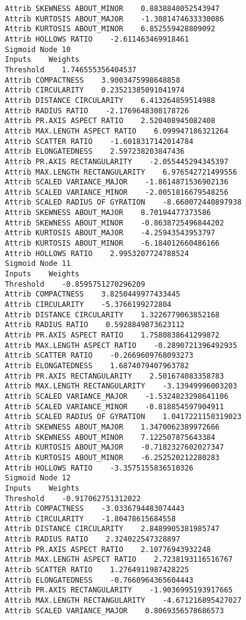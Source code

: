 \documentclass[
	article,			%
	11pt,				%
	oneside,			%
	a4paper,			%
	english,			%
	brazil,				%
	sumario=tradicional
	]{abntex2}
\begin{document}
\begin{lstlisting}
Attrib SKEWNESS ABOUT_MINOR    0.8838848052543947
Attrib KURTOSIS ABOUT_MAJOR    -1.3081474633330086
Attrib KURTOSIS ABOUT_MINOR    6.852559428809092
Attrib HOLLOWS RATIO    -2.611463469918461
Sigmoid Node 10
Inputs    Weights
Threshold    1.746555356404537
Attrib COMPACTNESS    3.9003475998648858
Attrib CIRCULARITY    0.23521385091041974
Attrib DISTANCE CIRCULARITY    6.413264859514988
Attrib RADIUS RATIO    -2.1769648308178726
Attrib PR.AXIS ASPECT RATIO    2.520408945082408
Attrib MAX.LENGTH ASPECT RATIO    6.099947186321264
Attrib SCATTER RATIO    -1.6018317142014784
Attrib ELONGATEDNESS    2.597238203847436
Attrib PR.AXIS RECTANGULARITY    -2.055445294345397
Attrib MAX.LENGTH RECTANGULARITY    6.976542721499556
Attrib SCALED VARIANCE_MAJOR    -1.8614871536902136
Attrib SCALED VARIANCE_MINOR    -2.0051816679548256
Attrib SCALED RADIUS OF GYRATION    -8.660072440897938
Attrib SKEWNESS ABOUT_MAJOR    8.70194477373586
Attrib SKEWNESS ABOUT_MINOR    -0.8638725496844202
Attrib KURTOSIS ABOUT_MAJOR    -4.25943543953797
Attrib KURTOSIS ABOUT_MINOR    -6.184012660486166
Attrib HOLLOWS RATIO    2.9953207724788524
Sigmoid Node 11
Inputs    Weights
Threshold    -0.8595751270296209
Attrib COMPACTNESS    3.8250449977433445
Attrib CIRCULARITY    -5.3766199272804
Attrib DISTANCE CIRCULARITY    1.3226779063852168
Attrib RADIUS RATIO    0.5928849873623112
Attrib PR.AXIS ASPECT RATIO    1.7580838641299872
Attrib MAX.LENGTH ASPECT RATIO    -0.2890721396492935
Attrib SCATTER RATIO    -0.2669609768093273
Attrib ELONGATEDNESS    1.6874079407963782
Attrib PR.AXIS RECTANGULARITY    2.501674083358783
Attrib MAX.LENGTH RECTANGULARITY    -3.13949996003203
Attrib SCALED VARIANCE_MAJOR    -1.5324823298641106
Attrib SCALED VARIANCE_MINOR    -0.818854597904911
Attrib SCALED RADIUS OF GYRATION    1.0417221150319023
Attrib SKEWNESS ABOUT_MAJOR    1.3470062389972666
Attrib SKEWNESS ABOUT_MINOR    7.122507875643384
Attrib KURTOSIS ABOUT_MAJOR    -0.7182327602027347
Attrib KURTOSIS ABOUT_MINOR    -6.252520212280283
Attrib HOLLOWS RATIO    -3.3575155836510326
Sigmoid Node 12
Inputs    Weights
Threshold    -0.917062751312022
Attrib COMPACTNESS    -3.0336794483074443
Attrib CIRCULARITY    -1.80478615684558
Attrib DISTANCE CIRCULARITY    2.8489905381985747
Attrib RADIUS RATIO    2.324022547328897
Attrib PR.AXIS ASPECT RATIO    2.10776943932248
Attrib MAX.LENGTH ASPECT RATIO    2.7238193116516767
Attrib SCATTER RATIO    1.2764911987428225
Attrib ELONGATEDNESS    -0.7660964365604443
Attrib PR.AXIS RECTANGULARITY    -1.9036995193917665
Attrib MAX.LENGTH RECTANGULARITY    -4.671216895427027
Attrib SCALED VARIANCE_MAJOR    0.8069356578686573

\end{lstlisting}
\end{document}
